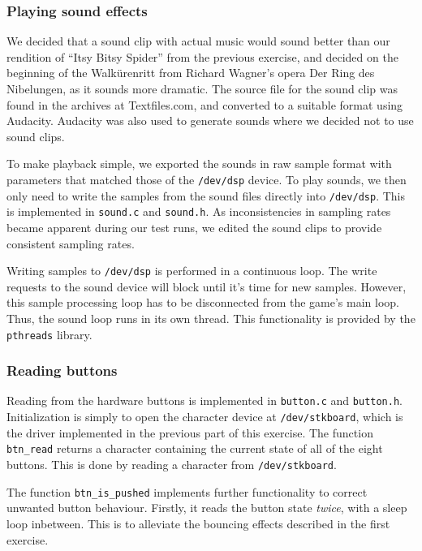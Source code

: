 

\subsubsection{Playing sound effects}

We decided that a sound clip with actual music would sound better than
our rendition of ``Itsy Bitsy Spider'' from the previous exercise, and
decided on the beginning of the Walkürenritt from Richard Wagner's
opera Der Ring des Nibelungen, as it sounds more dramatic. The source
file for the sound clip was found in the archives at Textfiles.com, and
converted to a suitable format using Audacity. Audacity was also used to
generate sounds where we decided not to use sound clips.

To make playback simple, we exported the sounds in raw sample format
with parameters that matched those of the \texttt{/dev/dsp} device. To
play sounds, we then only need to write the samples from the sound files
directly into \texttt{/dev/dsp}. This is implemented in \texttt{sound.c}
and \texttt{sound.h}. As inconsistencies in sampling rates became
apparent during our test runs, we edited the sound clips to provide
consistent sampling rates.

Writing samples to \texttt{/dev/dsp} is performed in a continuous loop.
The write requests to the sound device will block until it's time for
new samples. However, this sample processing loop has to be disconnected
from the game's main loop. Thus, the sound loop runs in its own thread.
This functionality is provided by the \texttt{pthreads} library.

\subsubsection{Reading buttons}

Reading from the hardware buttons is implemented in \texttt{button.c}
and \texttt{button.h}. Initialization is simply to open the character
device at \texttt{/dev/stkboard}, which is the driver implemented in the
previous part of this exercise. The function \texttt{btn\_read} returns
a character containing the current state of all of the eight buttons.
This is done by reading a character from \texttt{/dev/stkboard}.

The function \texttt{btn\_is\_pushed} implements further functionality to
correct unwanted button behaviour. Firstly, it reads the button state
\emph{twice}, with a sleep loop inbetween. This is to alleviate the
bouncing effects described in the first exercise.

